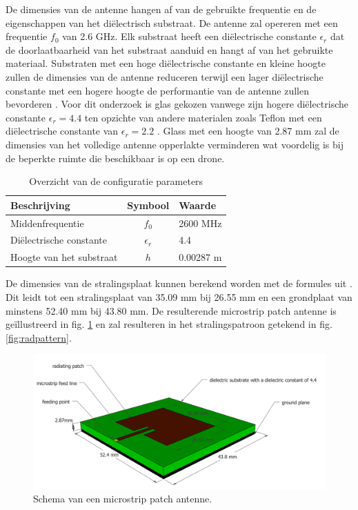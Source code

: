 \documentclass[twocolumn]{phdsymp_dutch}
\begin{document}
De dimensies van de antenne hangen af van de gebruikte frequentie en de eigenschappen van het di\"electrisch substraat.
De antenne zal opereren met een frequentie $f_0$ van 2.6 GHz. 
Elk substraat heeft een di\"electrische constante $\epsilon_r$ dat de doorlaatbaarheid 
van het substraat aanduid en hangt af van het gebruikte materiaal.
Substraten met een hoge di\"electrische constante en kleine hoogte zullen de dimensies van de antenne reduceren 
terwijl  een lager di\"electrische constante met een hogere hoogte de performantie van de 
antenne zullen bevorderen \cite{J14_antennadesign,J15_antennadesign}. 
Voor dit onderzoek is glas gekozen vanwege zijn hogere di\"electrische constante
 $\epsilon_r = 4.4$ ten opzichte van andere materialen zoals Teflon met een di\"electrische constante
van $\epsilon_r = 2.2$ \cite{J14_antennadesign}. 
Glass met een hoogte van 2.87 mm 
zal de dimensies van het volledige antenne opperlakte verminderen wat 
voordelig is bij de beperkte ruimte die beschikbaar is op een drone.

\begin{table}[h!]
\centering
\begin{tabular}{|l|c|l|}
\hline
 Beschrijving            & Symbool          & Waarde         \\    \hline
 Middenfrequentie      & $f_0$           & 2600 MHz       \\ 
 Di\"electrische constante    & $\epsilon_r$    & 4.4         \\ 
 Hoogte van het substraat & $h$             & 0.00287 m    \\ \hline
\end{tabular}
\caption{Overzicht van de configuratie parameters}
\label{table:antennaparas}
\end{table}

De dimensies van de stralingsplaat kunnen berekend worden met de formules uit \cite{J14_antennadesign,J15_antennadesign}.
Dit leidt tot een stralingsplaat van 35.09 mm bij 26.55 mm en  een grondplaat van minstens 52.40 mm bij 43.80 mm.
De resulterende microstrip patch antenne is ge\"illustreerd in fig. \ref{fig:basicpatchantenna} en zal resulteren 
in het stralingspatroon getekend in fig. \ref{fig:radpattern}.
\begin{figure}[h!]
\centering
  \includegraphics[width=\linewidth]{MicrostripAntenna.png}
  \caption{Schema van een microstrip patch antenne.}
  \label{fig:basicpatchantenna}
\end{figure}
\end{document}
